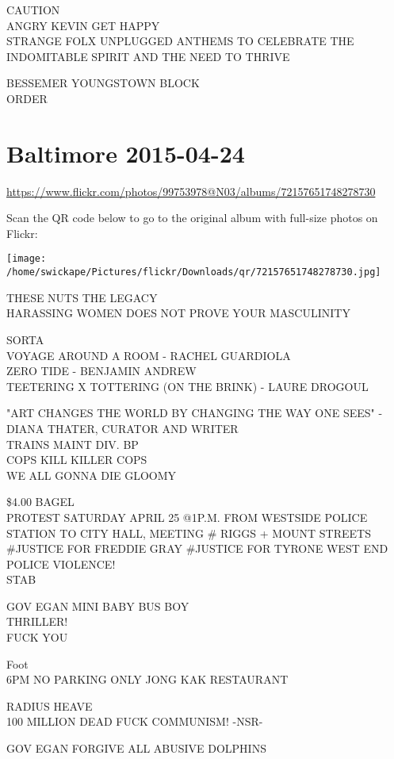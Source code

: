 \documentclass[10pt,letterpaper]{article}
\begin{document}
CAUTION\\
ANGRY KEVIN GET HAPPY\\
STRANGE FOLX UNPLUGGED ANTHEMS TO CELEBRATE THE INDOMITABLE SPIRIT AND THE NEED TO THRIVE

BESSEMER YOUNGSTOWN BLOCK\\
ORDER
\pagebreak

\section*{Baltimore 2015-04-24}

\url{https://www.flickr.com/photos/99753978@N03/albums/72157651748278730}

Scan the QR code below to go to the original album with full-size photos on Flickr:

\texttt{[image: /home/swickape/Pictures/flickr/Downloads/qr/72157651748278730.jpg]}
\pagebreak

THESE NUTS THE LEGACY\\
HARASSING WOMEN DOES NOT PROVE YOUR MASCULINITY

SORTA\\
VOYAGE AROUND A ROOM {-} RACHEL GUARDIOLA\\
ZERO TIDE {-} BENJAMIN ANDREW\\
TEETERING X TOTTERING (ON THE BRINK) {-} LAURE DROGOUL

"ART CHANGES THE WORLD BY CHANGING THE WAY ONE SEES" {-} DIANA THATER, CURATOR AND WRITER\\
TRAINS MAINT DIV. BP\\
COPS KILL KILLER COPS\\
WE ALL GONNA DIE GLOOMY

\$4.00 BAGEL\\
PROTEST SATURDAY APRIL 25 @1P.M. FROM WESTSIDE POLICE STATION TO CITY HALL, MEETING \# RIGGS + MOUNT STREETS\\
\#JUSTICE FOR FREDDIE GRAY \#JUSTICE FOR TYRONE WEST END POLICE VIOLENCE!\\
STAB

GOV EGAN MINI BABY BUS BOY\\
THRILLER!\\
FUCK YOU

Foot\\
6PM NO PARKING ONLY JONG KAK RESTAURANT

RADIUS HEAVE\\
100 MILLION DEAD FUCK COMMUNISM!  {-}NSR{-}

GOV EGAN FORGIVE ALL ABUSIVE DOLPHINS
\pagebreak
\end{document}
